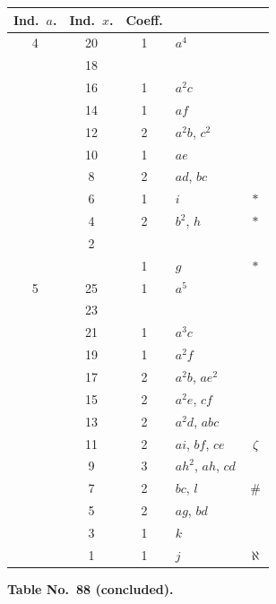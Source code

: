 \documentclass[11pt,a4paper]{article}
\begin{document}
\begin{center}
\begin{tabular}{ccc|l|c}
Ind.\ $a$. & Ind.\ $x$. & Coeff. & & \\\hline
4 & 20 & 1 & $a^{4}$ & \\
& 18 & & & \\
& 16 & 1 & $a^{2}c$ & \\
& 14 & 1 & $af$ & \\
& 12 & 2 & $a^{2}b$, $c^{2}$ & \\
& 10 & 1 & $ae$ & \\
& 8 & 2 & $ad$, $bc$ & \\
& 6 & 1 & $i$ & $*$\\
& 4 & 2 & $b^{2}$, $h$ & $*$\\
& 2 & & & \\
& & 1 & $g$ & $*$\\
\hline
5 & 25 & 1 & $a^{5}$ & \\
& 23 & & & \\
& 21 & 1 & $a^{3}c$ & \\
& 19 & 1 & $a^{2}f$ & \\
& 17 & 2 & $a^{2}b$, $ae^{2}$ & \\
& 15 & 2 & $a^{2}e$, $cf$ & \\
& 13 & 2 & $a^{2}d$, $abc$ & \\
& 11 & 2 & $ai$, $bf$, $ce$ & $\zeta$\\
& 9 & 3 & $ah^{2}$, $ah$, $cd$ & \\
& 7 & 2 & $bc$, $l$ & $\#$\\
& 5 & 2 & $ag$, $bd$ & \\
& 3 & 1 & $k$ & \\
& 1 & 1 & $j$ & $\aleph$
\end{tabular}
\end{center}

\newpage
\setcounter{page}{345}

\begin{center}
\textbf{Table No.~88 (concluded).}
\end{center}
\end{document}
